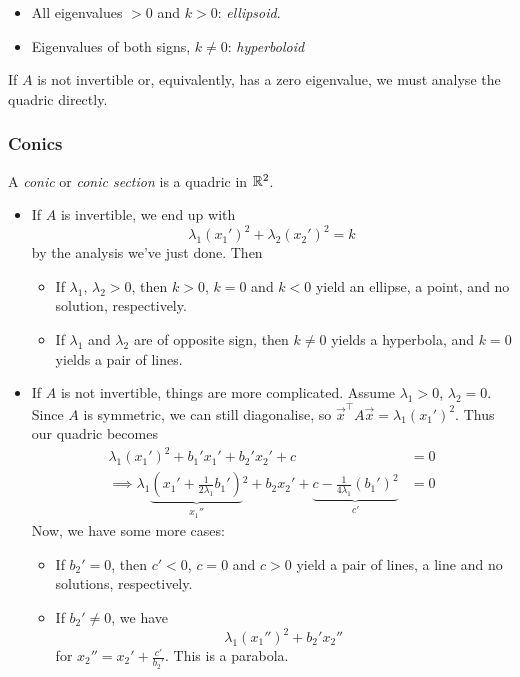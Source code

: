 \documentclass{../../template/note}
\begin{document}
    \begin{itemize}
        \item All eigenvalues \(>0\) and \(k>0\): \emph{ellipsoid}.
        \item Eigenvalues of both signs, \(k \neq 0\): \emph{hyperboloid}
    \end{itemize}
    
    If \(A\) is not invertible or, equivalently, has a zero eigenvalue, we must analyse the quadric directly.

    \subsubsection{Conics}

    \begin{definition}
        A \emph{conic} or \emph{conic section} is a quadric in \(\mathbb R^2\).
    \end{definition}
    
    \begin{itemize}
        \item If \(A\) is invertible, we end up with
        \[
            \lambda_1 (x_1')^2 + \lambda_2 (x_2')^2 = k
        \]
        by the analysis we've just done. Then
        \begin{itemize}
            \item If \(\lambda_1\), \(\lambda_2 > 0\), then \(k > 0\), \(k = 0\) and \(k < 0\) yield an ellipse, a point, and no solution, respectively.
            \item If \(\lambda_1\) and \(\lambda_2\) are of opposite sign, then \(k \neq 0\) yields a hyperbola, and \(k = 0\) yields a pair of lines.
        \end{itemize}
        \item If \(A\) is not invertible, things are more complicated. Assume \(\lambda_1 > 0\), \(\lambda_2 = 0\). Since \(A\) is symmetric, we can still diagonalise, so \(\vec x^\intercal A \vec x = \lambda_1(x_1')^2\). Thus our quadric becomes
        \begin{align*}
            \lambda_1(x_1')^2 + b_1'x_1' + b_2'x_2' + c &= 0 \\
            \implies \lambda_1 \underbrace{\left(x_1' + \frac{1}{2 \lambda_1}b_1'\right)}_{x_1''} {^2} + b_2x_2' + \underbrace{c - \frac{1}{4\lambda_1}(b_1')^2}_{c'} &= 0
        \end{align*}    
        Now, we have some more cases:
        \begin{itemize}
            \item If \(b_2'=0\), then \(c' < 0\), \(c = 0\) and \(c > 0\) yield a pair of lines, a line and no solutions, respectively.
            \item If \(b_2'\neq 0\), we have
            \[
                \lambda_1(x_1'')^2 + b_2'x_2''
            \]
            for \(x_2'' = x_2' + \frac{c'}{b_2'}\). This is a parabola.
        \end{itemize}
    \end{itemize}
    
\end{document}
